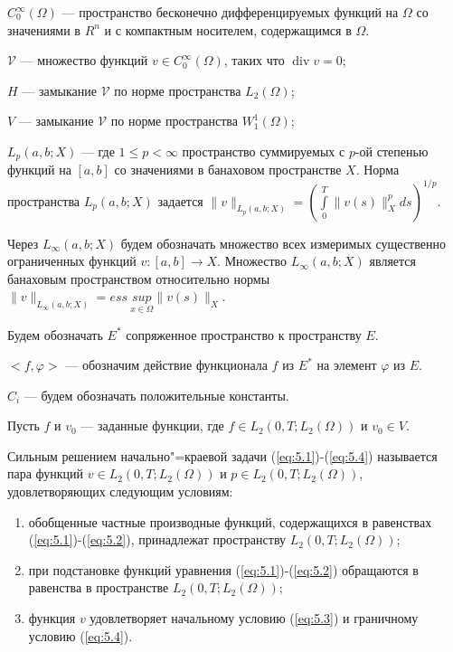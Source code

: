 $C_0^{\infty}(\Omega)$ --- пространство бесконечно дифференцируемых функций на $\Omega$ со значениями в $R^n$ и с компактным носителем,
содержащимся в $\Omega$.

$\mathcal{V}$ --- множество функций $v\in C_0^{\infty}(\Omega)$, таких что $\operatorname{div}v=0$;

$H$ --- замыкание $\mathcal{V}$ по норме пространства $L_2(\Omega)$;

$V$ --- замыкание $\mathcal{V}$ по норме пространства $W_1^1(\Omega)$;

$L_p(a,b;X)$ --- где $1\le p< \infty$ пространство суммируемых с $p$-ой степенью функций на $[a, b]$ со значениями в
банаховом пространстве $X$. Норма пространства $L_p(a, b;X)$ задается 
$\|v\|_{L_p(a, b;X)}=(\int\limits_0^T\|v(s)\|_X^p ds)^{1/p}.$

Через $L_{\infty}(a,b;X)$ будем обозначать множество всех измеримых существенно ограниченных функций $v:[a,b]\rightarrow X$.
Множество $L_{\infty}(a,b;X)$ является банаховым пространством относительно нормы $\|v\|_{L_{\infty}(a,b;X)}=ess \ \underset{x\in\Omega}{sup} \|v(s)\|_X$.

Будем обозначать $E^*$ сопряженное пространство к пространству $E$.

$<f,\varphi>$ --- обозначим действие функционала $f$ из $E^*$ на элемент $\varphi$ из $E$.

$C_i$ --- будем обозначать положительные константы.

Пусть $f$ и $v_0$ --- заданные функции,
где $f\in L_2(0, T; L_2(\Omega))$ и $v_0\in V$.

\begin{definition}
    Сильным решением начально"=краевой задачи (\ref{eq:5.1})-(\ref{eq:5.4}) называется пара функций $v\in L_2(0, T; L_2(\Omega))$ и
    $p\in L_2(0, T; L_2(\Omega))$, удовлетворяющих следующим условиям:
\end{definition}

\begin{enumerate} 
    \item обобщенные частные производные функций, содержащихся в равенствах (\ref{eq:5.1})-(\ref{eq:5.2}), принадлежат пространству $L_2(0, T; L_2(\Omega))$;
    \item при подстановке функций уравнения (\ref{eq:5.1})-(\ref{eq:5.2}) обращаются в равенства в пространстве $L_2(0, T; L_2(\Omega))$;
    \item функция $v$ удовлетворяет начальному условию (\ref{eq:5.3}) и граничному условию (\ref{eq:5.4}).
\end{enumerate}

